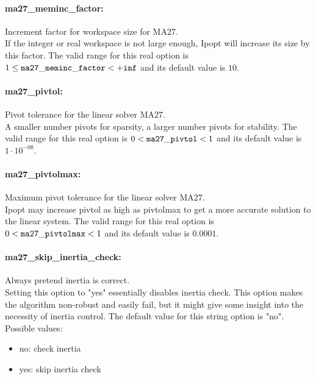 \paragraph{ma27\_meminc\_factor:}\label{sec:ma27_meminc_factor} Increment factor for workspace size for MA27. $\;$ \\
 If the integer or real workspace is not large
enough, Ipopt will increase its size by this
factor.  The valid range for this real option is 
$1 \le {\tt ma27\_meminc\_factor } <  {\tt +inf}$
and its default value is $10$.


\paragraph{ma27\_pivtol:}\label{sec:ma27_pivtol} Pivot tolerance for the linear solver MA27. $\;$ \\
 A smaller number pivots for sparsity, a larger
number pivots for stability. The valid range for this real option is 
$0 <  {\tt ma27\_pivtol } <  1$
and its default value is $1 \cdot 10^{-08}$.


\paragraph{ma27\_pivtolmax:}\label{sec:ma27_pivtolmax} Maximum pivot tolerance for the linear solver MA27. $\;$ \\
 Ipopt may increase pivtol as high as pivtolmax to
get a more accurate solution to the linear
system. The valid range for this real option is 
$0 <  {\tt ma27\_pivtolmax } <  1$
and its default value is $0.0001$.


\paragraph{ma27\_skip\_inertia\_check:}\label{sec:ma27_skip_inertia_check} Always pretend inertia is correct. $\;$ \\
 Setting this option to "yes" essentially disables
inertia check. This option makes the algorithm
non-robust and easily fail, but it might give
some insight into the necessity of inertia
control.
The default value for this string option is "no".
\\ 
Possible values:
\begin{itemize}
   \item no: check inertia
   \item yes: skip inertia check
\end{itemize}

